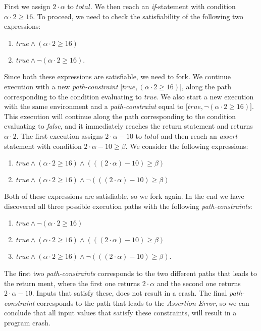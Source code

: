 		First we assign $2\cdot \alpha$ to $total$. We then reach an \textsl{if}-statement with condition $\alpha \cdot 2 \geq 16$. To proceed, we need to check the satisfiability of the following two expressions:
		\begin{enumerate}
			\item $true \land (\alpha \cdot 2 \geq 16)$
			\item $true \land \neg (\alpha \cdot 2 \geq 16)$.
		\end{enumerate}
		Since both these expressions are satisfiable, we need to fork. We continue execution with a new  \emph{path-constraint} $\lbrack true, (\alpha \cdot 2 \geq 16) \rbrack$, along the path corresponding to the condition evaluating to \emph{true}. We also start a new execution with the same environment and a \emph{path-constraint} equal to $\lbrack true, \neg (\alpha \cdot 2 \geq 16) \rbrack$. This execution will continue along the path corresponding to the condition evaluating to \emph{false}, and it immediately reaches the return statement and returns $\alpha \cdot 2$.
		The first execution assigns $2\cdot \alpha - 10$ to $total$ and then reach an \textsl{assert}-statement with condition $2\cdot \alpha - 10 \geq \beta$. We consider the following expressions:
		\begin{enumerate}
			\item $true \land (\alpha \cdot 2 \geq 16) \land (((2\cdot \alpha) - 10) \geq \beta)$
			\item $true \land (\alpha \cdot 2 \geq 16) \land \neg (((2\cdot \alpha) - 10) \geq \beta)$
		\end{enumerate}
		Both of these expressions are satisfiable, so we fork again. In the end we have discovered all three possible execution paths with the following \emph{path-constraints}:
		\begin{enumerate}
			\item $true \land \neg (\alpha \cdot 2 \geq 16)$
			\item $true \land (\alpha \cdot 2 \geq 16) \land (((2\cdot \alpha) - 10) \geq \beta)$
			\item $true \land (\alpha \cdot 2 \geq 16) 
			\land \neg (((2\cdot \alpha) - 10) \geq \beta)$.
		\end{enumerate}
		
		The first two \emph{path-constraints} corresponds to the two different paths that leads to the return  ment, where the first one returns $2\cdot \alpha$ and the second one returns $2\cdot \alpha - 10$. Inputs that satisfy these, does not result in a crash.
		The final \emph{path-constraint} corresponds to the path that leads to the \textsl{Assertion Error}, so we can conclude that all input values that satisfy these constraints, will result in a program crash.
	
